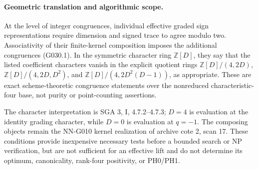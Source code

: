 \paragraph{Geometric translation and algorithmic scope.}
At the level of integer congruences, individual effective
graded sign representations require dimension and signed
trace to agree modulo two.
Associativity of their finite-kernel composition imposes
the additional congruences (G030.1). In the symmetric
character ring $\mathbb Z[D]$, they say that the listed
coefficient characters vanish in the explicit quotient
rings $\mathbb Z[D]/(4,2D)$,
$\mathbb Z[D]/(4,2D,D^2)$, and
$\mathbb Z[D]/(4,2D^2(D-1))$, as appropriate.
These are exact scheme-theoretic congruence statements
over the nonreduced characteristic-four base, not
purity or point-counting assertions.

The character interpretation is SGA 3, I, 4.7.2--4.7.3;
$D=4$ is evaluation at the identity grading character,
while $D=0$ is evaluation at $q=-1$.
The composing objects remain the NN-G010 kernel
realization of archive cote 2, scan 17. These conditions
provide inexpensive necessary tests before a bounded
search or NP verification, but are not sufficient for
an effective lift and do not determine its optimum,
canonicality, rank-four positivity, or PH0/PH1.
